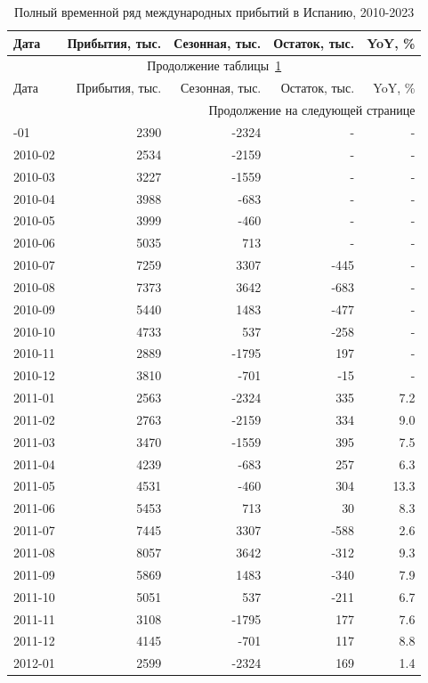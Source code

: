\begin{longtable}{lrrrr}
\caption{Полный временной ряд международных прибытий в Испанию, 2010-2023}
\label{tab:full}\\
\toprule
Дата & Прибытия, тыс. & Сезонная, тыс. & Остаток, тыс. & YoY, \% \\
\midrule
\endfirsthead
\multicolumn{5}{c}{Продолжение таблицы~\ref{tab:full}}\\
\toprule
Дата & Прибытия, тыс. & Сезонная, тыс. & Остаток, тыс. & YoY, \% \\
\midrule
\endhead
\midrule
\multicolumn{5}{r}{Продолжение на следующей странице}\\
\endfoot
\bottomrule
\endlastfoot
2010-01 & 2390 & -2324 & - & - \\
2010-02 & 2534 & -2159 & - & - \\
2010-03 & 3227 & -1559 & - & - \\
2010-04 & 3988 & -683 & - & - \\
2010-05 & 3999 & -460 & - & - \\
2010-06 & 5035 & 713 & - & - \\
2010-07 & 7259 & 3307 & -445 & - \\
2010-08 & 7373 & 3642 & -683 & - \\
2010-09 & 5440 & 1483 & -477 & - \\
2010-10 & 4733 & 537 & -258 & - \\
2010-11 & 2889 & -1795 & 197 & - \\
2010-12 & 3810 & -701 & -15 & - \\
2011-01 & 2563 & -2324 & 335 & 7.2 \\
2011-02 & 2763 & -2159 & 334 & 9.0 \\
2011-03 & 3470 & -1559 & 395 & 7.5 \\
2011-04 & 4239 & -683 & 257 & 6.3 \\
2011-05 & 4531 & -460 & 304 & 13.3 \\
2011-06 & 5453 & 713 & 30 & 8.3 \\
2011-07 & 7445 & 3307 & -588 & 2.6 \\
2011-08 & 8057 & 3642 & -312 & 9.3 \\
2011-09 & 5869 & 1483 & -340 & 7.9 \\
2011-10 & 5051 & 537 & -211 & 6.7 \\
2011-11 & 3108 & -1795 & 177 & 7.6 \\
2011-12 & 4145 & -701 & 117 & 8.8 \\
2012-01 & 2599 & -2324 & 169 & 1.4 \\

\end{longtable}
